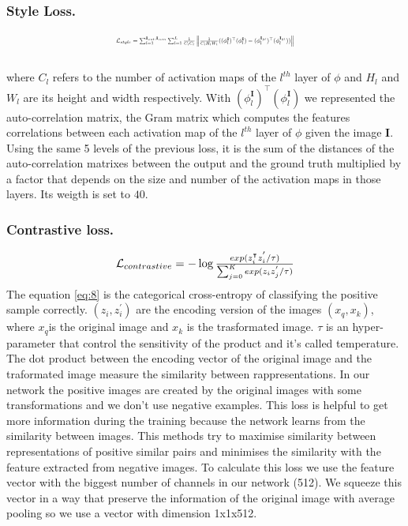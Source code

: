 \documentclass[10pt,twocolumn,letterpaper]{article}
\newcommand\norm[1]{\left\lVert#1\right\rVert}
\begin{document}
\subsubsection{Style Loss.}
\begin{equation}
    \resizebox{.47 \textwidth}{!}{%
        $\mathcal{L}_{style} = \sum^{\mathbf{I}_{out},\mathbf{I}_{com}}_{l=1} \sum^L_{l=1} \frac{1}{C_l C_l} \norm{ \frac{1}{C_l H_l W_l} ((\phi^{\mathbf{I}}_l)^\top(\phi^{\mathbf{I}}_l) - (\phi^{\mathbf{I}_{gt}}_l)^\top(\phi^{\mathbf{I}_{gt}}_l)  )}$%
}
\end{equation}
\\
where \(C_l\) refers to the number of activation maps of the \(l^{th}\) layer of \(\phi\) and \(H_l\) and \(W_l\) are its height and width respectively. With \((\phi^{\mathbf{I}}_l)^\top(\phi^{\mathbf{I}}_l)\) we represented the auto-correlation matrix, the Gram matrix\cite{gatys1508neural} which computes the features correlations between each activation map of the \(l^{th}\) layer of \(\phi\) given the image \(\mathbf{I}\).
\\
Using the same 5 levels of the previous loss, it is the sum of the distances of the auto-correlation matrixes between the output and the ground truth multiplied by a factor that depends on the size and number of the activation maps in those layers. Its weigth is set to \(40\).

\subsubsection{Contrastive loss.}
\begin{equation}
    \resizebox{.47 \textwidth}{!}{%
    $\mathcal{L}_{contrastive} = - \log{\frac{exp(z_{i}^\intercal z_{i}^{'}/\tau)}{\sum_{j=0}^{K}exp(z_{i}z_{j}^{'}/\tau)}}
    $%
    }
\end{equation}
The equation \eqref{eq:8} \cite{le2020contrastive} is the categorical cross-entropy of classifying the positive sample correctly\cite{oord2018representation}. \((z_{i}, z_{i}^{'})\) are the encoding version of the images \((x_{q}, x_{k})\), where \(x_{q}\)is the original image and \(x_{k}\) is the trasformated image. \(\tau\) is an hyper-parameter that control the sensitivity of the product and it's called temperature. The dot product between the encoding vector of the original image and the traformated image measure the similarity between rappresentations. In our network the positive images are created by the original images with some transformations and we don't use negative examples.
This loss is helpful to get more information during the training because the network learns from the similarity between images. This methods try to maximise similarity between representations of positive similar pairs and minimises the similarity with the feature extracted from negative images\cite{le2020contrastive}.
To calculate this loss we use the feature vector with the biggest number of channels in our network (512). We squeeze this vector in a way that preserve the information of the original image with average pooling so we use a vector with dimension 1x1x512. 
\end{document}
